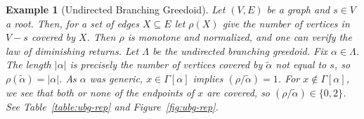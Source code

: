 \documentclass[11pt]{article}
\newtheorem{example}[theorem]{Example}
\newcommand{\glang}{\Lambda}
\begin{document}
\begin{example}[Undirected Branching Greedoid]\label{ex:ubg-rep}
     Let $(V, E)$ be a graph and $s \in V$ a root.
    Then, for a set of edges $X \subseteq E$ let $\rho(X)$ give the number of vertices in $V - s$ covered by $X$.
    Then $\rho$ is monotone and normalized, and one can verify the law of diminishing returns.
    Let $\glang$ be the undirected branching greedoid.
    Fix $\alpha\in \glang$.
    The length $|\alpha|$ is precisely the number of vertices covered by $\widetilde{\alpha}$ not equal to $s$, so $\rho(\widetilde{\alpha}) = |\alpha|$.
    As $\alpha$ was generic, $x \in \Gamma[\alpha]$ implies $\left(\rho/\widetilde{\alpha}\right)=1$.
    For $x \notin\Gamma[\alpha]$, we see that both or none of the endpoints of $x$ are covered, so $\left(\rho/\widetilde{\alpha}\right)\in\{0,2\}$.
    See Table~\ref{table:ubg-rep} and Figure~\ref{fig:ubg-rep}.
\end{example}
\end{document}
